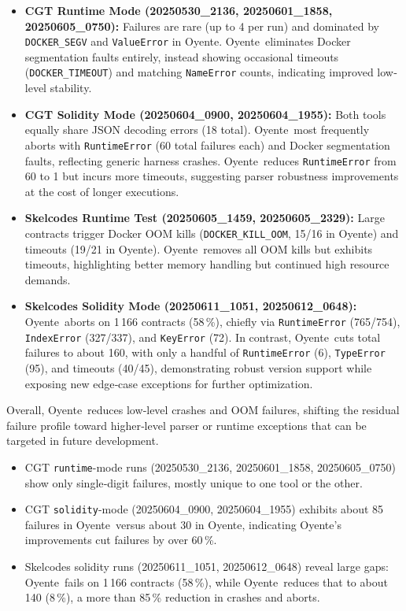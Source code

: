 \documentclass{article}
\newcommand\OY{Oyente}
\newcommand\OYp{\OY\raisebox{0.3ex}{\smaller +}}
\newcommand\CGTrbcA{20250530\_2136}%
\newcommand\CGTrbcB{20250601\_1858}%
\newcommand\CGTrbcC{20250605\_0750}%
\newcommand\CGTsscA{20250604\_0900}%
\newcommand\CGTsscB{20250604\_1955}%
\newcommand\SKCrbcA{20250605\_1459}%
\newcommand\SKCrbcB{20250605\_2329}%
\newcommand\SKCsscA{20250611\_1051}%
\newcommand\SKCsscB{20250612\_0648}%
\begin{document}
	\begin{itemize}
		\item \textbf{CGT Runtime Mode (\CGTrbcA, \CGTrbcB, \CGTrbcC):}
		Failures are rare (up to 4 per run) and dominated by \texttt{DOCKER\_SEGV} and \texttt{ValueError} in \OY.
		\OYp\ eliminates Docker segmentation faults entirely, instead showing occasional timeouts (\texttt{DOCKER\_TIMEOUT}) and matching \texttt{NameError} counts, indicating improved low‐level stability.

		\item \textbf{CGT Solidity Mode (\CGTsscA, \CGTsscB):}
		Both tools equally share JSON decoding errors (18 total).
		\OY\ most frequently aborts with \texttt{RuntimeError} (60 total failures each) and Docker segmentation faults, reflecting generic harness crashes.
		\OYp\ reduces \texttt{RuntimeError} from 60 to 1 but incurs more timeouts, suggesting parser robustness improvements at the cost of longer executions.

		\item \textbf{Skelcodes Runtime Test (\SKCrbcA, \SKCrbcB):}
		Large contracts trigger Docker OOM kills (\texttt{DOCKER\_KILL\_OOM}, 15/16 in \OY) and timeouts (19/21 in \OYp).
		\OYp\ removes all OOM kills but exhibits timeouts, highlighting better memory handling but continued high resource demands.

		\item \textbf{Skelcodes Solidity Mode (\SKCsscA, \SKCsscB):}
		\OY\ aborts on 1\,166 contracts (58\,\%), chiefly via \texttt{RuntimeError} (765/754), \texttt{IndexError} (327/337), and \texttt{KeyError} (72).
		In contrast, \OYp\ cuts total failures to about 160, with only a handful of \texttt{RuntimeError} (6), \texttt{TypeError} (95), and timeouts (40/45), demonstrating robust version support while exposing new edge‐case exceptions for further optimization.
	\end{itemize}

	Overall, \OYp\ reduces low‐level crashes and OOM failures, shifting the residual failure profile toward higher‐level parser or runtime exceptions that can be targeted in future development.

	\begin{itemize}
		\item CGT \texttt{runtime}-mode runs (\CGTrbcA, \CGTrbcB, \CGTrbcC) show only single‐digit failures, mostly unique to one tool or the other.
		\item CGT \texttt{solidity}-mode (\CGTsscA, \CGTsscB) exhibits about 85 failures in \OY\ versus about 30 in \OYp, indicating \OYp’s improvements cut failures by over 60\,\%.
		\item Skelcodes solidity runs (\SKCsscA, \SKCsscB) reveal large gaps: \OY\ fails on 1\,166 contracts (58\,\%), while \OYp\ reduces that to about 140 (8\,\%), a more than 85\,\% reduction in crashes and aborts.
	\end{itemize}
\end{document}

